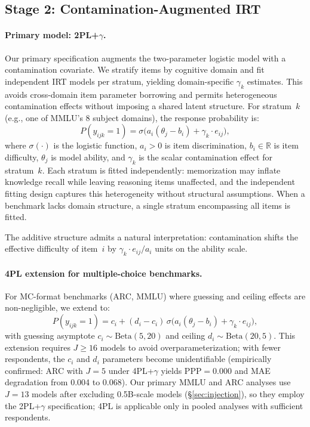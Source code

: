 \subsection{Stage 2: Contamination-Augmented IRT}
\label{sec:stage2}

\paragraph{Primary model: 2PL+$\gamma$.}
Our primary specification augments the two-parameter logistic model with a contamination covariate. We stratify items by cognitive domain and fit independent IRT models per stratum, yielding domain-specific $\gamma_k$ estimates. This avoids cross-domain item parameter borrowing and permits heterogeneous contamination effects without imposing a shared latent structure. For stratum~$k$ (e.g., one of MMLU's 8 subject domains), the response probability is:
\begin{equation}
\label{eq:2pl_gamma}
    P(y_{ijk} = 1) = \sigma\!\bigl(a_i(\theta_j - b_i) + \gamma_k \cdot e_{ij}\bigr),
\end{equation}
where $\sigma(\cdot)$ is the logistic function, $a_i > 0$ is item discrimination, $b_i \in \mathbb{R}$ is item difficulty, $\theta_j$ is model ability, and $\gamma_k$ is the scalar contamination effect for stratum~$k$. Each stratum is fitted independently: memorization may inflate knowledge recall while leaving reasoning items unaffected, and the independent fitting design captures this heterogeneity without structural assumptions. When a benchmark lacks domain structure, a single stratum encompassing all items is fitted.

The additive structure admits a natural interpretation: contamination shifts the effective difficulty of item~$i$ by $\gamma_k \cdot e_{ij} / a_i$ units on the ability scale.

\paragraph{4PL extension for multiple-choice benchmarks.}
For MC-format benchmarks (ARC, MMLU) where guessing and ceiling effects are non-negligible, we extend to:
\begin{equation}
\label{eq:4pl_gamma}
    P(y_{ijk} = 1) = c_i + (d_i - c_i)\,\sigma\!\bigl(a_i(\theta_j - b_i) + \gamma_k \cdot e_{ij}\bigr),
\end{equation}
with guessing asymptote $c_i \sim \text{Beta}(5,20)$ and ceiling $d_i \sim \text{Beta}(20,5)$. This extension requires $J \geq 16$ models to avoid overparameterization; with fewer respondents, the $c_i$ and $d_i$ parameters become unidentifiable (empirically confirmed: ARC with $J=5$ under 4PL+$\gamma$ yields PPP$=$0.000 and MAE degradation from 0.004 to 0.068). Our primary MMLU and ARC analyses use $J=13$ models after excluding 0.5B-scale models (\S\ref{sec:injection}), so they employ the 2PL+$\gamma$ specification; 4PL is applicable only in pooled analyses with sufficient respondents.

